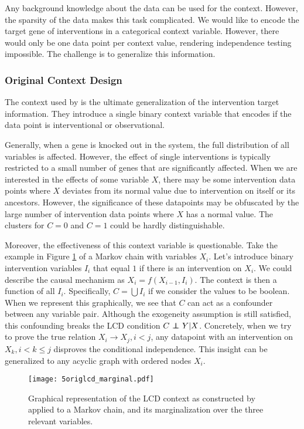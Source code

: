 Any background knowledge about the data can be used for the context. However, the sparsity of the data makes this task complicated. We would like to encode the target gene of interventions in a categorical context variable. However, there would only be one data point per context value, rendering independence testing impossible. The challenge is to generalize this information.

\subsubsection{Original Context Design}

The context used by \citet{versteeg2019boosting} is the ultimate generalization of the intervention target information. They introduce a single binary context variable that encodes if the data point is interventional or observational. 

Generally, when a gene is knocked out in the system, the full distribution of all variables is affected. However, the effect of single interventions is typically restricted to a small number of genes that are significantly affected. When we are interested in the effects of some variable $X$, there may be some intervention data points where $X$ deviates from its normal value due to intervention on itself or its ancestors. However, the significance of these datapoints may be obfuscated by the large number of intervention data points where $X$ has a normal value. The clusters for $C=0$ and $C=1$ could be hardly distinguishable. 

Moreover, the effectiveness of this context variable is questionable. Take the example in Figure \ref{fig:5:origlcd} of a Markov chain with variables $X_i$. Let's introduce binary intervention variables $I_i$ that equal $1$ if there is an intervention on $X_i$. We could describe the causal mechanism as $X_i = f(X_{i-1}, I_i)$. The context is then a function of all $I_i$. Specifically, $C=\bigcup I_i$ if we consider the values to be boolean. When we represent this graphically, we see that $C$ can act as a confounder between any variable pair. Although the exogeneity assumption is still satisfied, this confounding breaks the LCD condition $C\operatorname*{{\,\perp\mkern-12mu\perp\,}} Y|X$. Concretely, when we try to prove the true relation $X_i\to X_j, i<j$, any datapoint with an intervention on $X_k, i<k\leq j$ disproves the conditional independence. This insight can be generalized to any acyclic graph with ordered nodes $X_i$. 

\begin{figure}[h]
    \centering
    \texttt{[image: 5origlcd\_marginal.pdf]}
    \caption{Graphical representation of the LCD context as constructed by \citet{versteeg2019boosting} applied to a Markov chain, and its marginalization over the three relevant variables.}
    \label{fig:5:origlcd}
\end{figure}
 

